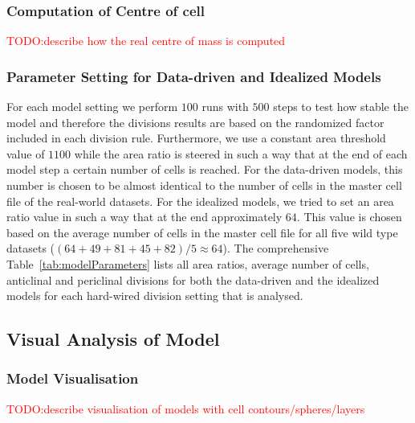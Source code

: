 \documentclass[11pt,a4paper, draft]{article}
\newcommand{\TODO}[1]{
\textcolor{red}{TODO:#1}
}
\begin{document}
\subsubsection{Computation of Centre of cell}
\noindent
\TODO{describe how the real centre of mass is computed}

\subsubsection{Parameter Setting for Data-driven and Idealized Models}
\noindent
For each model setting we perform $100$ runs with $500$ steps to test how stable the model and therefore the divisions results are based on the randomized factor included in each division rule. Furthermore, we use a constant area threshold value of $1100$ while the area ratio is steered in such a way that at the end of each model step a certain number of cells is reached. For the data-driven models, this number is chosen to be almost identical to the number of cells in the master cell file of the real-world datasets. For the idealized models, we tried to set an area ratio value in such a way that at the end approximately $64$. This value is chosen based on the average number of cells in the master cell file for all five wild type datasets ($(64+49+81+45+82)/5 \approx 64$). The comprehensive Table~\ref{tab:modelParameters} lists all area ratios, average number of cells, anticlinal and periclinal divisions for both the data-driven and the idealized models for each hard-wired division setting that is analysed.

\subsection{Visual Analysis of Model}
\subsubsection{Model Visualisation}
\noindent
\TODO{describe visualisation of models with cell contours/spheres/layers}
\end{document}
